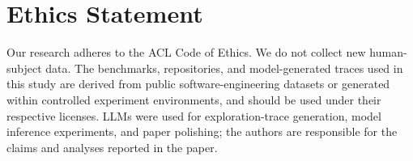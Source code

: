 \documentclass[11pt]{article}
\begin{document}
\section*{Ethics Statement}
Our research adheres to the ACL Code of Ethics. We do not collect new human-subject data. The benchmarks, repositories, and model-generated traces used in this study are derived from public software-engineering datasets or generated within controlled experiment environments, and should be used under their respective licenses. LLMs were used for exploration-trace generation, model inference experiments, and paper polishing; the authors are responsible for the claims and analyses reported in the paper.
 





\end{document}
